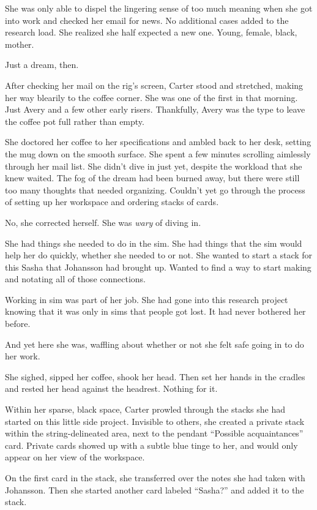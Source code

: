 She was only able to dispel the lingering sense of too much meaning when she got into work and checked her email for news. No additional cases added to the research load. She realized she half expected a new one. Young, female, black, mother.

Just a dream, then.

After checking her mail on the rig's screen, Carter stood and stretched, making her way blearily to the coffee corner. She was one of the first in that morning. Just Avery and a few other early risers. Thankfully, Avery was the type to leave the coffee pot full rather than empty.

She doctored her coffee to her specifications and ambled back to her desk, setting the mug down on the smooth surface. She spent a few minutes scrolling aimlessly through her mail list. She didn't dive in just yet, despite the workload that she knew waited. The fog of the dream had been burned away, but there were still too many thoughts that needed organizing. Couldn't yet go through the process of setting up her workspace and ordering stacks of cards.

No, she corrected herself. She was \emph{wary} of diving in.

She had things she needed to do in the sim. She had things that the sim would help her do quickly, whether she needed to or not. She wanted to start a stack for this Sasha that Johansson had brought up. Wanted to find a way to start making and notating all of those connections.

Working in sim was part of her job. She had gone into this research project knowing that it was only in sims that people got lost. It had never bothered her before.

And yet here she was, waffling about whether or not she felt safe going in to do her work.

She sighed, sipped her coffee, shook her head. Then set her hands in the cradles and rested her head against the headrest. Nothing for it.

Within her sparse, black space, Carter prowled through the stacks she had started on this little side project. Invisible to others, she created a private stack within the string-delineated area, next to the pendant ``Possible acquaintances'' card. Private cards showed up with a subtle blue tinge to her, and would only appear on her view of the workspace.

On the first card in the stack, she transferred over the notes she had taken with Johansson. Then she started another card labeled ``Sasha?'' and added it to the stack.


